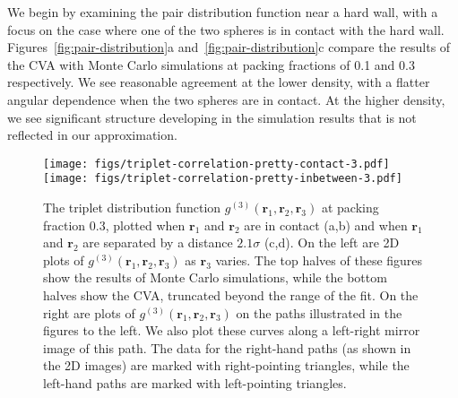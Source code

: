 \documentclass[letterpaper,twocolumn,amsmath,amssymb,pre,aps,10pt]{revtex4-1}
\newcommand{\rr}{\textbf{r}}
\begin{document}
We begin by examining the pair distribution function near a hard wall,
with a focus on the case where one of the two spheres is in contact
with the hard wall.  Figures~\ref{fig:pair-distribution}a
and~\ref{fig:pair-distribution}c compare the results of the CVA with
Monte Carlo simulations at packing fractions of 0.1 and 0.3
respectively. We see reasonable agreement at the lower density, with a flatter angular
dependence when the two spheres are in contact.  At the higher
density, we see significant structure developing in the simulation
results that is not reflected in our approximation.

\begin{figure*}
  \texttt{[image: figs/triplet-correlation-pretty-contact-3.pdf]}
  \vspace{-0.7cm}
\\
  \texttt{[image: figs/triplet-correlation-pretty-inbetween-3.pdf]}
  \vspace{-0.7cm}
  \caption{The triplet distribution function
    $g^{(3)}(\rr_1,\rr_2,\rr_3)$ at packing fraction 0.3, plotted when
    $\rr_1$ and $\rr_2$ are in contact (a,b) and when $\rr_1$ and
    $\rr_2$ are separated by a distance $2.1\sigma$ (c,d). On the left
    are 2D plots of $g^{(3)}(\rr_1,\rr_2,\rr_3)$ as $\rr_3$
    varies. %
%
    The top halves of these figures show the results of Monte Carlo
    simulations, while the bottom halves show the CVA, truncated
    beyond the range of the fit.  On the right
    are plots of $g^{(3)}(\rr_1,\rr_2,\rr_3)$ on the paths illustrated
    in the figures to the left.
%
    We also plot these curves along a left-right mirror image of this
    path.  The data for the right-hand paths (as shown in the 2D
    images) are marked with right-pointing triangles, while the
    left-hand paths are marked with left-pointing triangles.
%
  }
  \label{fig:triplet-contact-distribution}
\end{figure*}
\end{document}
